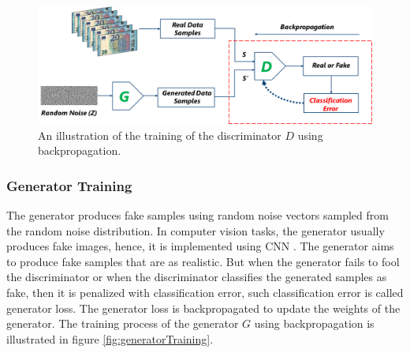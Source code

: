 
\vspace*{0.2cm}
\begin{figure}[H]
        \begin{center}
	    \includegraphics[scale=0.30]{images/Fundamentals/discriminatorTraining.png}
	    \caption[An illustration of the training of the discriminator $D$ using backpropagation.]{An illustration of the training of the discriminator $D$ using backpropagation.}
	    \label{fig:discriminatorTraining}
	    \end{center}
\end{figure}

\subsubsection{Generator Training}\label{TheGeneratorSubSection}

The generator produces fake samples using random noise vectors sampled from the random noise distribution. In computer vision tasks, the generator usually produces fake images, hence, it is implemented using \ac{CNN} \cite{radford2016unsupervised}. The generator aims to produce fake samples that are as realistic. But when the generator fails to fool the discriminator or when the discriminator classifies the generated samples as fake, then it is penalized with classification error, such classification error is called generator loss. The generator loss is backpropagated to update the weights of the generator. The training process of the generator $G$ using backpropagation is illustrated in figure \ref{fig:generatorTraining}.


